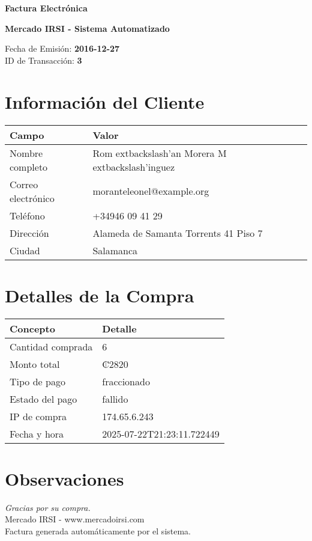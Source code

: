 \documentclass[10pt]{article}
\begin{document}
\begin{center}
    \Huge \textbf{Factura Electrónica}

    \vspace{0.3cm}
    \large \textbf{Mercado IRSI - Sistema Automatizado}

    \vspace{0.5cm}
    \normalsize Fecha de Emisión: \textbf{2016-12-27} \\
    ID de Transacción: \textbf{3} \\
\end{center}

\vspace{1cm}

\section*{Información del Cliente}
\begin{tabularx}{\textwidth}{>{\raggedright\arraybackslash}p{4cm} X}
\rowcolor{lightgray}
\textbf{Campo} & \textbf{Valor} \\
\hline
Nombre completo & Rom	extbackslash{}'{a}n Morera M	extbackslash{}'{i}nguez \\
Correo electrónico & moranteleonel@example.org \\
Teléfono & +34946 09 41 29 \\
Dirección & Alameda de Samanta Torrents 41 Piso 7  \\
Ciudad & Salamanca \\
\end{tabularx}

\vspace{0.8cm}

\section*{Detalles de la Compra}
\begin{tabularx}{\textwidth}{>{\raggedright\arraybackslash}p{6cm} X}
\rowcolor{lightgray}
\textbf{Concepto} & \textbf{Detalle} \\
\hline
Cantidad comprada & 6 \\
Monto total & ₡2820 \\
Tipo de pago & fraccionado \\
Estado del pago & fallido \\
IP de compra & 174.65.6.243 \\
Fecha y hora & 2025-07-22T21:23:11.722449 \\
\end{tabularx}

\vspace{1.5cm}

\section*{Observaciones}


\vfill

\begin{center}
    \textit{Gracias por su compra.} \\
    Mercado IRSI - www.mercadoirsi.com \\
    Factura generada automáticamente por el sistema.
\end{center}
\end{document}
